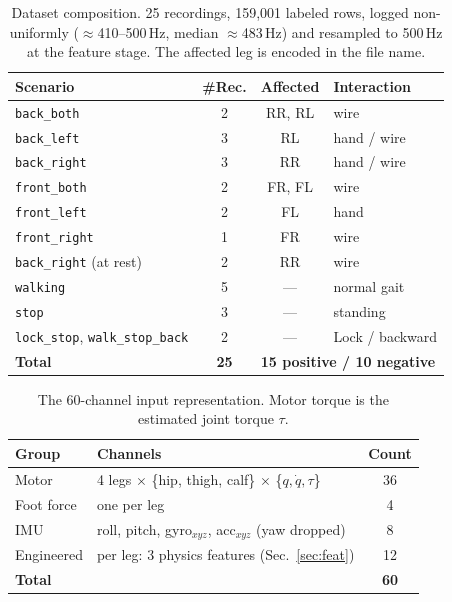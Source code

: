 
\begin{table}[t]
\centering
\caption{Dataset composition. 25 recordings, 159{,}001 labeled rows, logged non-uniformly
($\approx$410--500\,Hz, median $\approx$483\,Hz) and resampled to 500\,Hz at the feature stage. The
affected leg is encoded in the file name.}
\label{tab:dataset}
\footnotesize
\begin{tabular}{@{}lccl@{}}
\toprule
Scenario & \#Rec. & Affected & Interaction \\
\midrule
\texttt{back\_both}  & 2 & RR, RL & wire \\
\texttt{back\_left}  & 3 & RL     & hand / wire \\
\texttt{back\_right} & 3 & RR     & hand / wire \\
\texttt{front\_both} & 2 & FR, FL & wire \\
\texttt{front\_left} & 2 & FL     & hand \\
\texttt{front\_right}& 1 & FR     & wire \\
\texttt{back\_right} (at rest) & 2 & RR & wire \\
\midrule
\texttt{walking} & 5 & --- & normal gait \\
\texttt{stop}    & 3 & --- & standing \\
\texttt{lock\_stop}, \texttt{walk\_stop\_back} & 2 & --- & Lock / backward \\
\midrule
\textbf{Total} & \textbf{25} & \multicolumn{2}{l}{\textbf{15 positive / 10 negative}} \\
\bottomrule
\end{tabular}
\end{table}

\begin{table}[t]
\centering
\caption{The 60-channel input representation. Motor torque is the estimated joint torque $\tau$.}
\label{tab:features}
\footnotesize
\begin{tabular}{@{}llc@{}}
\toprule
Group & Channels & Count \\
\midrule
Motor & 4 legs $\times$ \{hip, thigh, calf\} $\times$ \{$q,\dot q,\tau$\} & 36 \\
Foot force & one per leg & 4 \\
IMU & roll, pitch, gyro$_{xyz}$, acc$_{xyz}$ (yaw dropped) & 8 \\
Engineered & per leg: 3 physics features (Sec.~\ref{sec:feat}) & 12 \\
\midrule
\textbf{Total} & & \textbf{60} \\
\bottomrule
\end{tabular}
\end{table}


